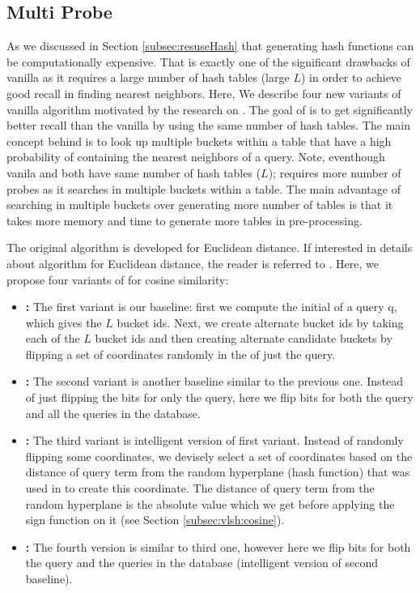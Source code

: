 \subsection{Multi Probe \lsh}
\label{sec:mblsh}
As we discussed in Section \ref{subsec:resuseHash} that generating hash functions can be computationally expensive.  
That is exactly one of the significant drawbacks of vanilla \lsh as it requires a large number of hash tables (large $L$) 
in order to achieve good recall in finding nearest neighbors.
Here, We describe four new variants of vanilla \lsh algorithm motivated by the research on \mblshf \cite{LvVLDB07}. 
The goal of  \mblshf is to get significantly better recall than the vanilla \lsh by using 
the same number of hash tables. The main concept behind \mblshf is to look 
up multiple buckets within a table that have a high probability of containing the nearest neighbors of a query. 
Note, eventhough vanila \lsh and \mblshf both have same number of hash tables ($L$); 
\mblshf requires more number of probes as it searches in multiple buckets within a table. 
The main advantage of searching in multiple buckets over generating more number of tables 
is that it takes more memory and time to generate more tables in pre-processing. 


The original \mblshf algorithm is developed for Euclidean distance. 
If interested in details about \mblshf algorithm for Euclidean distance, the reader is referred to \cite{LvVLDB07}. 
Here, we propose four variants of \mblshf for cosine similarity:
\begin{itemize}
\item {\bf \rflipq:} The first variant is our baseline: first we compute the initial \lsh of a query q, which gives the $L$ bucket ids.  
Next, we create alternate bucket ids by taking each of the $L$ bucket ids and then creating alternate candidate buckets by flipping a 
set of coordinates randomly in the \lsh of just the query.  
\item {\bf \rflipb:} The second variant is another baseline similar to the previous one. Instead of just flipping the bits for only the query, 
here we flip bits for both the query and all the queries in the database. 
\item {\bf \dflipq:} The third variant is intelligent version of first variant. Instead of randomly flipping some coordinates, 
we devisely select a set of coordinates based on the distance of query term from the random hyperplane (hash function) 
that was used in to create this coordinate. 
The distance of query term from the random hyperplane is the absolute value which we get before applying the sign function on it (see Section \ref{subsec:vlsh:cosine}). 
\item {\bf \dflipb:} The fourth version is similar to third one, however 
here we flip bits for both the query and the queries in the database (intelligent version of second baseline). 
\end{itemize}


